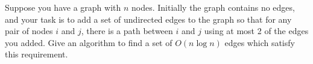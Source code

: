 \problem{}
Suppose you have a graph with $n$ nodes.  Initially the graph contains no edges, and your task is to add a set of undirected edges to the graph so that for any pair of nodes $i$ and $j$, there is a path between $i$ and $j$ using at most 2 of the edges you added.  Give an algorithm to find a set of $O(n \log n)$ edges which satisfy this requirement.  












\newpage
